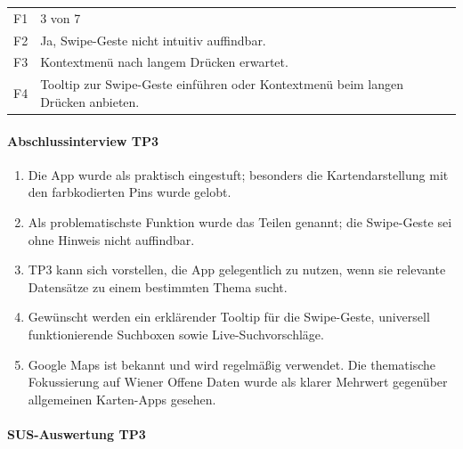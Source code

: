 \documentclass{article}
\begin{document}
\begin{tabular}{@{}lp{10cm}@{}}
  F1 & 3 von 7 \\
  F2 & Ja, Swipe-Geste nicht intuitiv auffindbar. \\
  F3 & Kontextmenü nach langem Drücken erwartet. \\
  F4 & Tooltip zur Swipe-Geste einführen oder Kontextmenü beim
       langen Drücken anbieten. \\
\end{tabular}

\paragraph{Abschlussinterview TP3}

\begin{enumerate}
  \item Die App wurde als praktisch eingestuft; besonders die
        Kartendarstellung mit den farbkodierten Pins wurde gelobt.
  \item Als problematischste Funktion wurde das Teilen genannt;
        die Swipe-Geste sei ohne Hinweis nicht auffindbar.
  \item TP3 kann sich vorstellen, die App gelegentlich zu nutzen,
        wenn sie relevante Datensätze zu einem bestimmten Thema sucht.
  \item Gewünscht werden ein erklärender Tooltip für die Swipe-Geste,
        universell funktionierende Suchboxen sowie Live-Suchvorschläge.
  \item Google Maps ist bekannt und wird regelmäßig verwendet.
        Die thematische Fokussierung auf Wiener Offene Daten wurde als
        klarer Mehrwert gegenüber allgemeinen Karten-Apps gesehen.
\end{enumerate}

\paragraph{SUS-Auswertung TP3}
\end{document}
